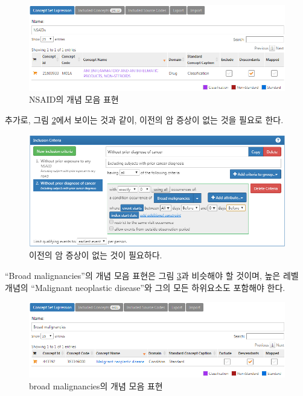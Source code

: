 \documentclass[10.5pt]{book}
\theoremstyle{definition}
\theoremstyle{definition}
\theoremstyle{definition}
\theoremstyle{remark}
\begin{document}
\begin{figure}

{\centering \includegraphics[width=1\linewidth]{images/SuggestedAnswers/cohortsAtlasConceptSet2} 

}

\caption{NSAID의 개념 모음 표현}\label{fig:cohortsAtlasConceptSet2}
\end{figure}

추가로, 그림 \ref{fig:cohortsAtlasInclusion2}에서 보이는 것과 같이,
이전의 암 증상이 없는 것을 필요로 한다.

\begin{figure}

{\centering \includegraphics[width=1\linewidth]{images/SuggestedAnswers/cohortsAtlasInclusion2} 

}

\caption{이전의 암 증상이 없는 것이 필요하다.}\label{fig:cohortsAtlasInclusion2}
\end{figure}

``Broad malignancies''의 개념 모음 표현은 그림
\ref{fig:cohortsAtlasConceptSet3}과 비슷해야 할 것이며, 높은 레벨 개념의
``Malignant neoplastic disease''와 그의 모든 하위요소도 포함해야 한다.

\begin{figure}

{\centering \includegraphics[width=1\linewidth]{images/SuggestedAnswers/cohortsAtlasConceptSet3} 

}

\caption{broad malignancies의 개념 모음 표현}\label{fig:cohortsAtlasConceptSet3}
\end{figure}
\end{document}
